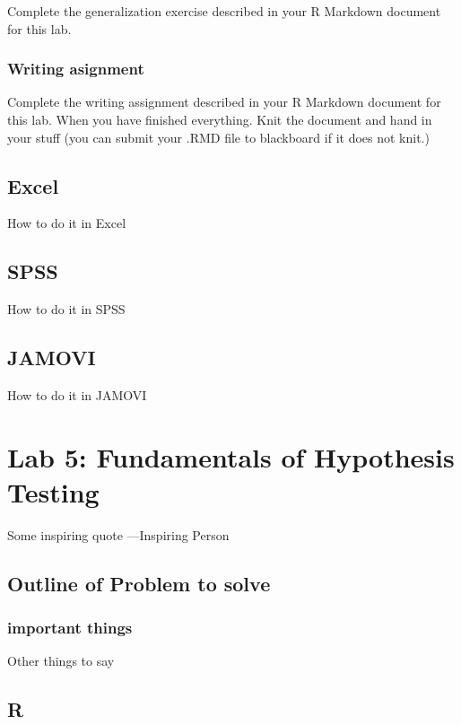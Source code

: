 \documentclass[]{book}
\theoremstyle{definition}
\theoremstyle{definition}
\theoremstyle{definition}
\theoremstyle{remark}
\begin{document}
Complete the generalization exercise described in your R Markdown
document for this lab.

\subsection{Writing asignment}\label{writing-asignment-2}

Complete the writing assignment described in your R Markdown document
for this lab. When you have finished everything. Knit the document and
hand in your stuff (you can submit your .RMD file to blackboard if it
does not knit.)

\section{Excel}\label{excel-3}

How to do it in Excel

\section{SPSS}\label{spss-3}

How to do it in SPSS

\section{JAMOVI}\label{jamovi-3}

How to do it in JAMOVI

\chapter{Lab 5: Fundamentals of Hypothesis
Testing}\label{lab-5-fundamentals-of-hypothesis-testing}

{ Some inspiring quote ---Inspiring Person }

\section{Outline of Problem to
solve}\label{outline-of-problem-to-solve-3}

\subsection{important things}\label{important-things-3}

Other things to say

\section{R}\label{r-5}
\end{document}
